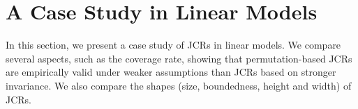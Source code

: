 \documentclass[english]{article}
\begin{document}
    


\section{A Case Study in Linear Models}\label{sec:simulation}

In this section, we present a case study of JCRs
in linear models.
We compare several aspects, such as the coverage rate, showing that permutation-based JCRs are empirically valid under weaker assumptions than JCRs based on stronger invariance.
We also compare the shapes (size, boundedness, height and width) of JCRs. 
 
\end{document}
